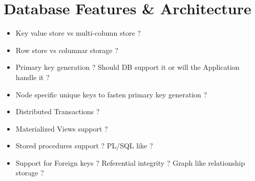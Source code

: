 \section{Database Features & Architecture}

\begin{itemize}
\item Key value store vs multi-column store ?
\end{itemize}
\begin{itemize}
\item Row store vs columnar storage ?
\end{itemize}
\begin{itemize}
\item Primary key generation ? Should DB support it or will the Application handle it ?
\end{itemize}
\begin{itemize}
\item Node specific unique keys to fasten primary key generation ?
\end{itemize}
\begin{itemize}
\item Distributed Transactions ?
\end{itemize}
\begin{itemize}
\item Materialized Views support ?
\end{itemize}
\begin{itemize}
\item Stored procedures support ? PL/SQL like ?
\end{itemize}
\begin{itemize}
\item Support for Foreign keys ? Referential integrity ? Graph like relationship storage ?
\end{itemize}